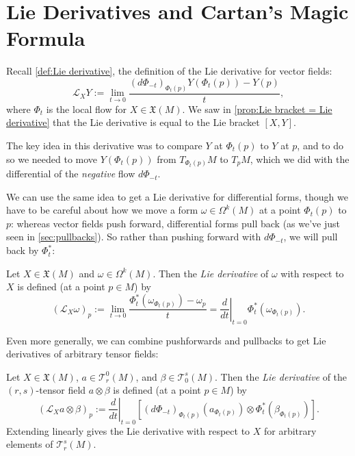 
\section{Lie Derivatives and Cartan's Magic Formula}

Recall \cref{def:Lie derivative}, the definition of the Lie derivative for vector fields:
\[
	\mathcal{L}_XY := \lim_{t \to 0} \frac{(d\Phi_{-t})_{\Phi_t(p)}Y(\Phi_t(p))-Y(p)}{t},
\]
where $\Phi_t$ is the local flow for $X \in \mathfrak{X}(M)$. We saw in \cref{prop:Lie bracket = Lie derivative} that the Lie derivative is equal to the Lie bracket $[X,Y]$.

The key idea in this derivative was to compare $Y$ at $\Phi_t(p)$ to $Y$ at $p$, and to do so we needed to move $Y(\Phi_t(p))$ from $T_{\Phi_t(p)}M$ to $T_pM$, which we did with the differential of the \emph{negative} flow $d\Phi_{-t}$.

We can use the same idea to get a Lie derivative for differential forms, though we have to be careful about how we move a form $\omega \in \Omega^k(M)$ at a point $\Phi_t(p)$ to $p$: whereas vector fields push forward, differential forms pull back (as we've just seen in \cref{sec:pullbacks}). So rather than pushing forward with $d\Phi_{-t}$, we will pull back by $\Phi_t^\ast$:

\begin{definition}\label{def:Lie derivative of differential form}
	Let $X \in \mathfrak{X}(M)$ and $\omega \in \Omega^k(M)$. Then the \emph{Lie derivative} of $\omega$ with respect to $X$ is defined (at a point $p \in M$) by
	\[
		\left(\mathcal{L}_X\omega\right)_p := \lim_{t \to 0} \frac{\Phi_t^\ast(\omega_{\Phi_t(p)})-\omega_p}{t} = \left. \frac{d}{dt}\right|_{t=0} \Phi_t^\ast(\omega_{\Phi_t(p)}).
	\]
\end{definition}

Even more generally, we can combine pushforwards and pullbacks to get Lie derivatives of arbitrary tensor fields:

\begin{definition}\label{def:Lie derivative of tensor fields}
	Let $X \in \mathfrak{X}(M)$, $a \in \mathcal{T}_r^0(M)$, and $\beta \in \mathcal{T}_0^s(M)$. Then the \emph{Lie derivative} of the $(r,s)$-tensor field $a \otimes \beta$ is defined (at a point $p \in M$) by
	\[
		\left( \mathcal{L}_X a \otimes \beta\right)_p := \left. \frac{d}{dt} \right|_{t=0} \left[ \left(d\Phi_{-t}\right)_{\Phi_t(p)} \left(a _{\Phi_t(p)} \right) \otimes \Phi_t^\ast\left(\beta_{\Phi_t(p)}\right)\right].
	\]
	Extending linearly gives the Lie derivative with respect to $X$ for arbitrary elements of $\mathcal{T}_r^s(M)$.
\end{definition}

